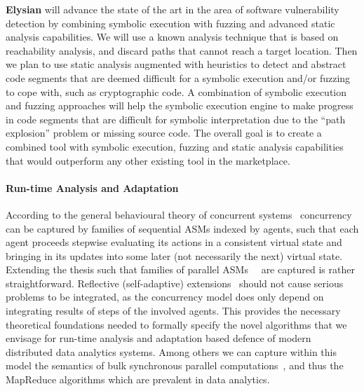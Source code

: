 \documentclass[a4paper,11pt]{article}
\newcommand{\project}[1]{\textbf{#1}\xspace}
\newcommand{\SECURITY}{\project{Elysian}}
\newcommand{\TheProject}{\SECURITY}
\begin{document}
\begin{mdframed}[backgroundcolor=gray!10]
\TheProject{} will advance the state of the art in the area of software vulnerability detection by combining symbolic execution with fuzzing and advanced static analysis capabilities. We will use a known analysis technique that is based on reachability analysis, and discard paths that cannot reach a target location. Then we plan to use static analysis augmented with heuristics to detect and abstract code segments that are deemed difficult for a symbolic execution and/or fuzzing to cope with, such as cryptographic code. A combination of symbolic execution and fuzzing approaches will help the symbolic execution engine to make progress in code segments that are difficult for symbolic interpretation due to the “path explosion” problem or missing source code. The overall goal is to create a combined tool with symbolic execution, fuzzing and static analysis capabilities that would outperform any other existing tool in the marketplace.

\end{mdframed}


\paragraph{Run-time Analysis and Adaptation}
According to the general behavioural theory of concurrent systems~\cite{BorgerS16} concurrency can be captured by families of sequential ASMs indexed by agents, such that each agent proceeds stepwise evaluating its actions in a consistent virtual state and bringing in its updates into some later (not necessarily the next) virtual state. Extending the thesis such that families of parallel ASMs~\cite{FerrarottiSTW16}  are captured is rather straightforward. Reflective (self-adaptive) extensions~\cite{abs-2001-01873} should not cause serious problems to be integrated, as the concurrency model does only depend on integrating results of steps of the involved agents. This provides the necessary theoretical foundations  needed to formally specify the novel algorithms that we envisage for run-time analysis and adaptation based defence of modern distributed data analytics systems. Among others we can capture within this model the semantics of bulk synchronous parallel computations~\cite{FerrarottiGS19}, and thus the MapReduce algorithms which are prevalent in data analytics. 
\end{document}
